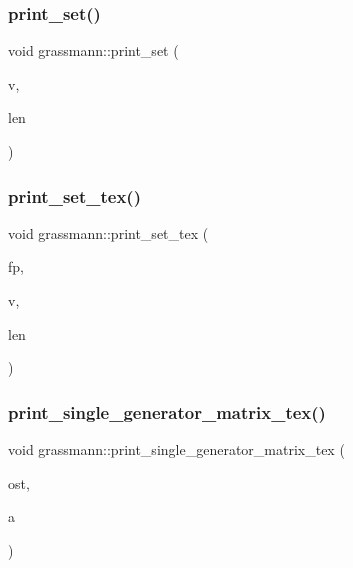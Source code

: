\subsubsection{\texorpdfstring{print\+\_\+set()}{print\_set()}}
{\footnotesize\ttfamily void grassmann\+::print\+\_\+set (\begin{DoxyParamCaption}\item[{\mbox{\hyperlink{galois_8h_a09fddde158a3a20bd2dcadb609de11dc}{I\+NT}} $\ast$}]{v,  }\item[{\mbox{\hyperlink{galois_8h_a09fddde158a3a20bd2dcadb609de11dc}{I\+NT}}}]{len }\end{DoxyParamCaption})}

\mbox{\label{classgrassmann_a74fa10fcb3978850ec19df007440e7d2}} 
\subsubsection{\texorpdfstring{print\+\_\+set\+\_\+tex()}{print\_set\_tex()}}
{\footnotesize\ttfamily void grassmann\+::print\+\_\+set\+\_\+tex (\begin{DoxyParamCaption}\item[{ofstream \&}]{fp,  }\item[{\mbox{\hyperlink{galois_8h_a09fddde158a3a20bd2dcadb609de11dc}{I\+NT}} $\ast$}]{v,  }\item[{\mbox{\hyperlink{galois_8h_a09fddde158a3a20bd2dcadb609de11dc}{I\+NT}}}]{len }\end{DoxyParamCaption})}

\mbox{\label{classgrassmann_aac233f873cf4090359aab75e9604a573}} 
\subsubsection{\texorpdfstring{print\+\_\+single\+\_\+generator\+\_\+matrix\+\_\+tex()}{print\_single\_generator\_matrix\_tex()}}
{\footnotesize\ttfamily void grassmann\+::print\+\_\+single\+\_\+generator\+\_\+matrix\+\_\+tex (\begin{DoxyParamCaption}\item[{ostream \&}]{ost,  }\item[{\mbox{\hyperlink{galois_8h_a09fddde158a3a20bd2dcadb609de11dc}{I\+NT}}}]{a }\end{DoxyParamCaption})}

